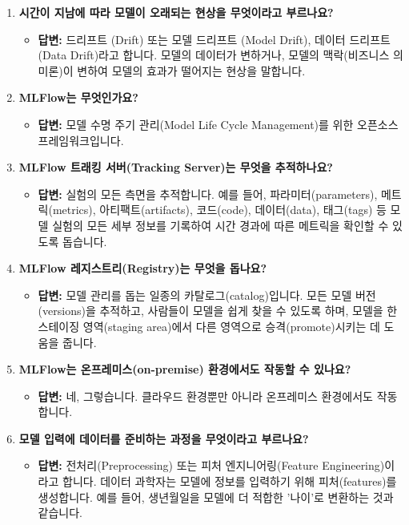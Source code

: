 \documentclass[11pt,a4paper]{article}
\begin{document}
\begin{enumerate}
    \item \textbf{시간이 지남에 따라 모델이 오래되는 현상을 무엇이라고 부르나요?}
    \begin{itemize}
        \item \textbf{답변:} 드리프트 (Drift) 또는 모델 드리프트 (Model Drift), 데이터 드리프트 (Data Drift)라고 합니다. 모델의 데이터가 변하거나, 모델의 맥락(비즈니스 의미론)이 변하여 모델의 효과가 떨어지는 현상을 말합니다.
    \end{itemize}

    \item \textbf{MLFlow는 무엇인가요?}
    \begin{itemize}
        \item \textbf{답변:} 모델 수명 주기 관리(Model Life Cycle Management)를 위한 오픈소스 프레임워크입니다.
    \end{itemize}

    \item \textbf{MLFlow 트래킹 서버(Tracking Server)는 무엇을 추적하나요?}
    \begin{itemize}
        \item \textbf{답변:} 실험의 모든 측면을 추적합니다. 예를 들어, 파라미터(parameters), 메트릭(metrics), 아티팩트(artifacts), 코드(code), 데이터(data), 태그(tags) 등 모델 실험의 모든 세부 정보를 기록하여 시간 경과에 따른 메트릭을 확인할 수 있도록 돕습니다.
    \end{itemize}

    \item \textbf{MLFlow 레지스트리(Registry)는 무엇을 돕나요?}
    \begin{itemize}
        \item \textbf{답변:} 모델 관리를 돕는 일종의 카탈로그(catalog)입니다. 모든 모델 버전(versions)을 추적하고, 사람들이 모델을 쉽게 찾을 수 있도록 하며, 모델을 한 스테이징 영역(staging area)에서 다른 영역으로 승격(promote)시키는 데 도움을 줍니다.
    \end{itemize}

    \item \textbf{MLFlow는 온프레미스(on-premise) 환경에서도 작동할 수 있나요?}
    \begin{itemize}
        \item \textbf{답변:} 네, 그렇습니다. 클라우드 환경뿐만 아니라 온프레미스 환경에서도 작동합니다.
    \end{itemize}

    \item \textbf{모델 입력에 데이터를 준비하는 과정을 무엇이라고 부르나요?}
    \begin{itemize}
        \item \textbf{답변:} 전처리(Preprocessing) 또는 피처 엔지니어링(Feature Engineering)이라고 합니다. 데이터 과학자는 모델에 정보를 입력하기 위해 피처(features)를 생성합니다. 예를 들어, 생년월일을 모델에 더 적합한 '나이'로 변환하는 것과 같습니다.
    \end{itemize}


\end{enumerate}
\end{document}
